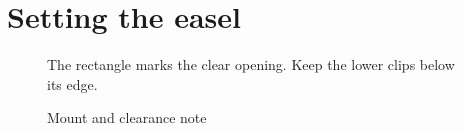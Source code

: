 \documentclass{article}
\begin{document}
\section*{Setting the easel}

\begin{figure}[h]\begin{minipage}[c]{.46\linewidth}\centering
\fbox{\rule{0pt}{22mm}\rule{30mm}{0pt}}\end{minipage}\hfill
\begin{minipage}[c]{.46\linewidth}The rectangle marks the clear opening. Keep the lower clips below its edge.\end{minipage}
\caption{Mount and clearance note}\end{figure}
\end{document}
